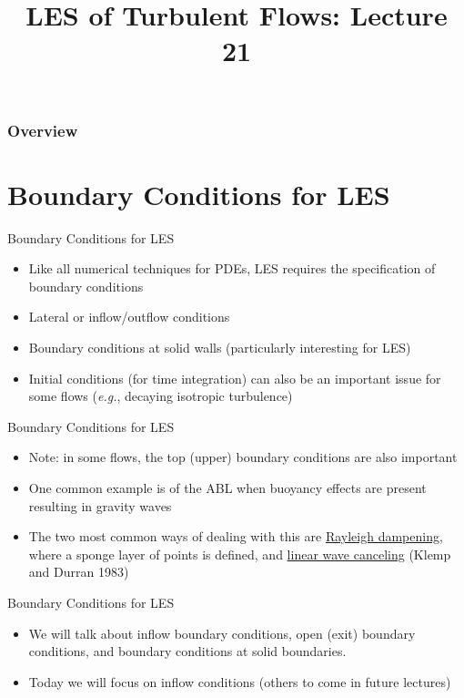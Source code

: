  
\title{LES of Turbulent Flows: Lecture 21}



\begin{frame} 
  \titlepage
\end{frame}


\begin{frame}
\frametitle{Overview}
\tableofcontents
\end{frame}

\section{Boundary Conditions for LES} %
\begin{frame}{Boundary Conditions for LES}
\begin{itemize}
	\item Like all numerical techniques for PDEs, LES requires the specification of boundary conditions
	\item Lateral or inflow/outflow conditions
	\item Boundary conditions at solid walls (particularly interesting for LES)
	\item Initial conditions (for time integration) can also be an important issue for some flows (\textit{e.g.}, decaying isotropic turbulence)
\end{itemize}
\end{frame}
\begin{frame}{Boundary Conditions for LES}
\begin{itemize}
	\item Note: in some flows, the top (upper) boundary conditions are also important
	\item One common example is of the ABL when buoyancy effects are present resulting in gravity waves
	\item The two most common ways of dealing with this are \underline{Rayleigh dampening}, where a sponge layer of points is defined, and \underline{linear wave canceling} (Klemp and Durran 1983)
\end{itemize}
\end{frame}
\begin{frame}{Boundary Conditions for LES}
\begin{itemize}
	\item We will talk about inflow boundary conditions, open (exit) boundary conditions, and boundary conditions at solid boundaries.  
	\item Today we will focus on inflow conditions (others to come in future lectures)
\end{itemize}
\end{frame}
